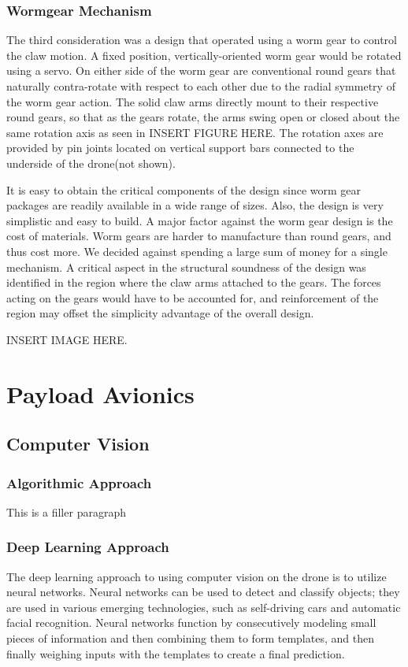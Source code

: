 		\subsubsection{Wormgear Mechanism}
			The third consideration was a design that operated using a worm gear to control the claw motion. A fixed position, vertically-oriented worm gear would be rotated using a servo. On either side of the worm gear are conventional round gears that naturally contra-rotate with respect to each other due to the radial symmetry of the worm gear action. The solid claw arms directly mount to their respective round gears, so that as the gears rotate, the arms swing open or closed about the same rotation axis as seen in INSERT FIGURE HERE. The rotation axes are provided by pin joints located on vertical support bars connected to the underside of the drone(not shown).

			It is easy to obtain the critical components of the design since worm gear packages are readily available in a wide range of sizes. Also, the design is very simplistic and easy to build. A major factor against the worm gear design is the cost of materials. Worm gears are harder to manufacture than round gears, and thus cost more. We decided against spending a large sum of money for a single mechanism. A critical aspect in the structural soundness of the design was identified in the region where the claw arms attached to the gears. The forces acting on the gears would have to be accounted for, and reinforcement of the region may offset the simplicity advantage of the overall design.
			
			INSERT IMAGE HERE.

\section{Payload Avionics}\label{PL:Tradeoffs:Avionics}
	\subsection{Computer Vision}
		\subsubsection{Algorithmic Approach}
			This is a filler paragraph

		\subsubsection{Deep Learning Approach}
			The deep learning approach to using computer vision on the drone is to utilize neural networks. Neural networks can be used to detect and classify objects; they are used in various emerging technologies, such as self-driving cars and automatic facial recognition. 
			Neural networks function by consecutively modeling small pieces of information and then combining them to form templates, and then finally weighing inputs with the templates to create a final prediction.
		
